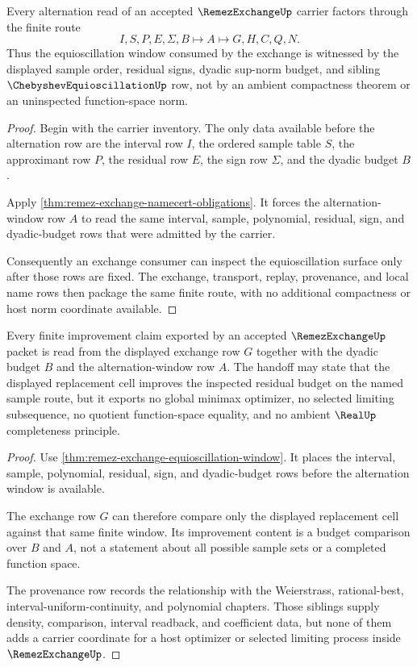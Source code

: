 \begin{theorem}
\label{thm:remez-exchange-equioscillation-window}
Every alternation read of an accepted $\RemezExchangeUp$ carrier factors through the finite route
$$
I,S,P,E,\Sigma,B \longmapsto A \longmapsto G,H,C,Q,N .
$$
Thus the equioscillation window consumed by the exchange is witnessed by the displayed sample order, residual signs, dyadic sup-norm budget, and sibling $\ChebyshevEquioscillationUp$ row, not by an ambient compactness theorem or an uninspected function-space norm.
\end{theorem}
\begin{proof}
Begin with the carrier inventory. The only data available before the alternation row are the interval row $I$, the ordered sample table $S$, the approximant row $P$, the residual row $E$, the sign row $\Sigma$, and the dyadic budget $B$.

Apply \autoref{thm:remez-exchange-namecert-obligations}. It forces the alternation-window row $A$ to read the same interval, sample, polynomial, residual, sign, and dyadic-budget rows that were admitted by the carrier.

Consequently an exchange consumer can inspect the equioscillation surface only after those rows are fixed. The exchange, transport, replay, provenance, and local name rows then package the same finite route, with no additional compactness or host norm coordinate available.
\end{proof}

\begin{theorem}
\label{thm:remez-exchange-finite-improvement}
Every finite improvement claim exported by an accepted $\RemezExchangeUp$ packet is read from the displayed exchange row $G$ together with the dyadic budget $B$ and the alternation-window row $A$. The handoff may state that the displayed replacement cell improves the inspected residual budget on the named sample route, but it exports no global minimax optimizer, no selected limiting subsequence, no quotient function-space equality, and no ambient $\RealUp$ completeness principle.
\end{theorem}
\begin{proof}
Use \autoref{thm:remez-exchange-equioscillation-window}. It places the interval, sample, polynomial, residual, sign, and dyadic-budget rows before the alternation window is available.

The exchange row $G$ can therefore compare only the displayed replacement cell against that same finite window. Its improvement content is a budget comparison over $B$ and $A$, not a statement about all possible sample sets or a completed function space.

The provenance row records the relationship with the Weierstrass, rational-best, interval-uniform-continuity, and polynomial chapters. Those siblings supply density, comparison, interval readback, and coefficient data, but none of them adds a carrier coordinate for a host optimizer or selected limiting process inside $\RemezExchangeUp$.
\end{proof}

